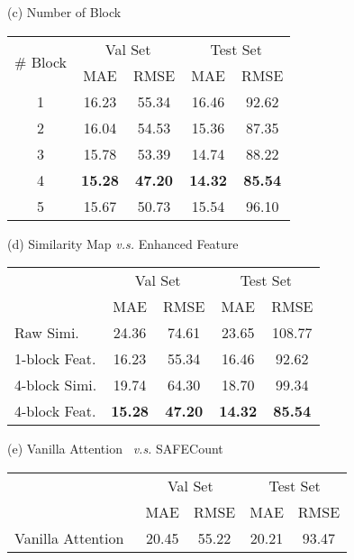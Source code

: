 \documentclass[10pt,twocolumn,letterpaper]{article}
\newcommand{\method}{SAFECount\xspace}
\begin{document}
\begin{table*}[tb]
\begin{minipage}[t]{0.23\textwidth}
\setlength\tabcolsep{1pt}
\centering
\scriptsize
\vspace{-12.5pt}
(c) Number of Block \\
\begin{tabular}{ccccc}
\toprule
\multirow{2}{*}{\# Block} 
& \multicolumn{2}{c}{Val Set} & \multicolumn{2}{c}{Test Set} \\
\cmidrule{2-5}
& MAE & RMSE & MAE & RMSE \\
\midrule
1 & 16.23 & 55.34  & 16.46 & 92.62  \\
2 & 16.04 & 54.53  & 15.36 & 87.35  \\
3 & 15.78 & 53.39  & 14.74 & 88.22  \\
4 & \textbf{15.28} & \textbf{47.20} & \textbf{14.32} & \textbf{85.54} \\
5 & 15.67 & 50.73 & 15.54 & 96.10 \\
\bottomrule
\end{tabular}
\end{minipage}
\hfill
\begin{minipage}[t]{0.25\textwidth}
\setlength\tabcolsep{1pt}
\centering
\scriptsize
(d) Similarity Map \textit{v.s.} Enhanced Feature \\
\begin{tabular}{lcccc}
\toprule
\multirow{2}{*}{} 
& \multicolumn{2}{c}{Val Set} & \multicolumn{2}{c}{Test Set} \\
\cmidrule{2-5}
& MAE & RMSE & MAE & RMSE \\
\midrule
Raw Simi. & 24.36 & 74.61 & 23.65 & 108.77 \\
1-block Feat. & 16.23 & 55.34 & 16.46 & 92.62 \\
4-block Simi. & 19.74 & 64.30 & 18.70 & 99.34 \\
4-block Feat. & \textbf{15.28} & \textbf{47.20} & \textbf{14.32} & \textbf{85.54} \\
\bottomrule
\end{tabular}
\end{minipage}
\vfill
\vspace{3pt}
\begin{minipage}[t]{0.33\textwidth}
\setlength\tabcolsep{3pt}
\centering
\scriptsize
(e) Vanilla Attention~\cite{attention_need} \textit{v.s.} \method
\begin{tabular}{ccccc}
\toprule
& \multicolumn{2}{c}{Val Set} & \multicolumn{2}{c}{Test Set} \\
\cmidrule{2-5}
& MAE & RMSE & MAE & RMSE \\
\midrule
Vanilla Attention~\cite{attention_need} & 20.45 & 55.22 & 20.21 & 93.47  \\

\end{tabular}
\end{minipage}
\end{table*}
\end{document}
